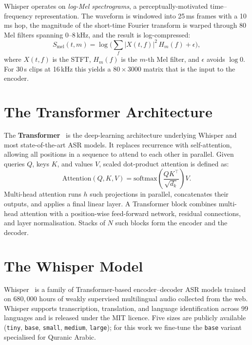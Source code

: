 Whisper operates on \emph{log-Mel spectrograms}, a perceptually-motivated
time--frequency representation. The waveform is windowed into 25\,ms frames
with a 10\,ms hop, the magnitude of the short-time Fourier transform is
warped through 80 Mel filters spanning 0--8\,kHz, and the result is
log-compressed:
\begin{equation}
\label{eq:mt_logmel}
S_{\mathrm{mel}}(t,m) = \log\!\Big( \sum_{f} |X(t,f)|^2 \, H_m(f) + \epsilon \Big),
\end{equation}
where $X(t,f)$ is the STFT, $H_m(f)$ is the $m$-th Mel filter, and
$\epsilon$ avoids $\log 0$. For 30\,s clips at 16\,kHz this yields a
$80\times 3000$ matrix that is the input to the encoder.

\section{The Transformer Architecture}
\label{sec:mt_transformer}

The \textbf{Transformer}~\cite{vaswani2017attention} is the deep-learning
architecture underlying Whisper and most state-of-the-art ASR models. It
replaces recurrence with self-attention, allowing all positions in a
sequence to attend to each other in parallel. Given queries $Q$, keys $K$,
and values $V$, scaled dot-product attention is defined as:
\begin{equation}
\label{eq:mt_attention}
\mathrm{Attention}(Q,K,V) = \mathrm{softmax}\!\left(\frac{QK^{\top}}{\sqrt{d_k}}\right) V.
\end{equation}
Multi-head attention runs $h$ such projections in parallel, concatenates
their outputs, and applies a final linear layer. A Transformer block
combines multi-head attention with a position-wise feed-forward network,
residual connections, and layer normalisation. Stacks of $N$ such blocks
form the encoder and the decoder.

\section{The Whisper Model}
\label{sec:mt_whisper}

\begin{emeraldbox}[title={Whisper (OpenAI, 2022)}]
Whisper~\cite{radford2022whisper} is a family of Transformer-based
encoder--decoder ASR models trained on $680{,}000$ hours of weakly
supervised multilingual audio collected from the web. Whisper supports
transcription, translation, and language identification across 99
languages and is released under the MIT licence. Five sizes are publicly
available (\texttt{tiny}, \texttt{base}, \texttt{small}, \texttt{medium},
\texttt{large}); for this work we fine-tune the \texttt{base} variant
specialised for Quranic Arabic.
\end{emeraldbox}

